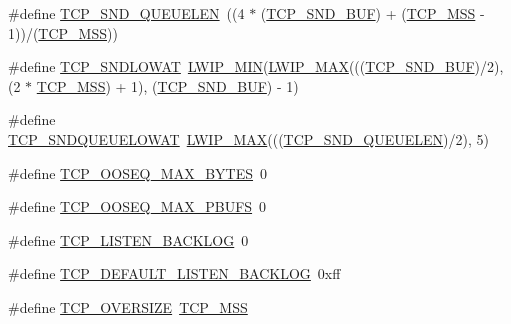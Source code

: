 \begin{DoxyCompactItemize}
\item 
\#define \hyperlink{group__lwip__opts__tcp_ga9beaa47832ead4180981bfbf71074904}{T\+C\+P\+\_\+\+S\+N\+D\+\_\+\+Q\+U\+E\+U\+E\+L\+EN}~((4 $\ast$ (\hyperlink{openmote-cc2538_2lwip_2test_2unit_2lwipopts_8h_a871d111968d8c6c7880ff36b93c5c4dd}{T\+C\+P\+\_\+\+S\+N\+D\+\_\+\+B\+UF}) + (\hyperlink{group__lwip__opts__tcp_gaf1ab7bb27860aa3677c387a2f3ba317b}{T\+C\+P\+\_\+\+M\+SS} -\/ 1))/(\hyperlink{group__lwip__opts__tcp_gaf1ab7bb27860aa3677c387a2f3ba317b}{T\+C\+P\+\_\+\+M\+SS}))
\item 
\#define \hyperlink{group__lwip__opts__tcp_gae5c9866d7cd463ac7b36792182145aec}{T\+C\+P\+\_\+\+S\+N\+D\+L\+O\+W\+AT}~\hyperlink{openmote-cc2538_2lwip_2src_2include_2lwip_2def_8h_a748f5df614a3fc989e8900fd229d6e4e}{L\+W\+I\+P\+\_\+\+M\+IN}(\hyperlink{openmote-cc2538_2lwip_2src_2include_2lwip_2def_8h_a21ea174d374106caeafb4aa3a24fbd2b}{L\+W\+I\+P\+\_\+\+M\+AX}(((\hyperlink{openmote-cc2538_2lwip_2test_2unit_2lwipopts_8h_a871d111968d8c6c7880ff36b93c5c4dd}{T\+C\+P\+\_\+\+S\+N\+D\+\_\+\+B\+UF})/2), (2 $\ast$ \hyperlink{group__lwip__opts__tcp_gaf1ab7bb27860aa3677c387a2f3ba317b}{T\+C\+P\+\_\+\+M\+SS}) + 1), (\hyperlink{openmote-cc2538_2lwip_2test_2unit_2lwipopts_8h_a871d111968d8c6c7880ff36b93c5c4dd}{T\+C\+P\+\_\+\+S\+N\+D\+\_\+\+B\+UF}) -\/ 1)
\item 
\#define \hyperlink{group__lwip__opts__tcp_ga75659867592a6b01c198532ed1b65698}{T\+C\+P\+\_\+\+S\+N\+D\+Q\+U\+E\+U\+E\+L\+O\+W\+AT}~\hyperlink{openmote-cc2538_2lwip_2src_2include_2lwip_2def_8h_a21ea174d374106caeafb4aa3a24fbd2b}{L\+W\+I\+P\+\_\+\+M\+AX}(((\hyperlink{openmote-cc2538_2lwip_2test_2unit_2lwipopts_8h_a9beaa47832ead4180981bfbf71074904}{T\+C\+P\+\_\+\+S\+N\+D\+\_\+\+Q\+U\+E\+U\+E\+L\+EN})/2), 5)
\item 
\#define \hyperlink{group__lwip__opts__tcp_ga9d6d3219bb5fc0bc760a64114de13c25}{T\+C\+P\+\_\+\+O\+O\+S\+E\+Q\+\_\+\+M\+A\+X\+\_\+\+B\+Y\+T\+ES}~0
\item 
\#define \hyperlink{group__lwip__opts__tcp_ga1f57d3859c4556f785708e5dc440617e}{T\+C\+P\+\_\+\+O\+O\+S\+E\+Q\+\_\+\+M\+A\+X\+\_\+\+P\+B\+U\+FS}~0
\item 
\#define \hyperlink{group__lwip__opts__tcp_ga98b23e7cbd3281915c50a485cb61899d}{T\+C\+P\+\_\+\+L\+I\+S\+T\+E\+N\+\_\+\+B\+A\+C\+K\+L\+OG}~0
\item 
\#define \hyperlink{group__lwip__opts__tcp_ga93cce3f47e33df11248c908d1775bacf}{T\+C\+P\+\_\+\+D\+E\+F\+A\+U\+L\+T\+\_\+\+L\+I\+S\+T\+E\+N\+\_\+\+B\+A\+C\+K\+L\+OG}~0xff
\item 
\#define \hyperlink{group__lwip__opts__tcp_ga5648e2580bb55c0efdfbebcf3bad1eef}{T\+C\+P\+\_\+\+O\+V\+E\+R\+S\+I\+ZE}~\hyperlink{group__lwip__opts__tcp_gaf1ab7bb27860aa3677c387a2f3ba317b}{T\+C\+P\+\_\+\+M\+SS}

\end{DoxyCompactItemize}
